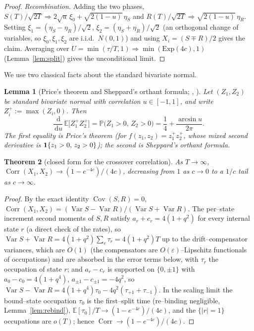 \documentclass[11pt]{article}
\theoremstyle{plain}
\newtheorem{theorem}{Theorem}[section]
\newtheorem{lemma}[theorem]{Lemma}
\theoremstyle{definition}
\theoremstyle{remark}
\DeclareMathOperator{\Var}{Var}\DeclareMathOperator{\Cov}{Cov}
\DeclareMathOperator{\Corr}{Corr}\DeclareMathOperator{\cum}{cum}
\newcommand{\E}{\mathbb{E}}\newcommand{\PP}{\mathbb{P}}\newcommand{\dd}{\,\mathrm{d}}
\newcommand{\To}{\Rightarrow}\newcommand{\so}{\mathfrak{so}}
\newcommand{\eps}{\varepsilon}\newcommand{\Exp}{\mathrm{Exp}}
\begin{document}
\begin{proof}
\emph{Recombination.} Adding the two phases,
$S(T)/\sqrt{2T}\To2\sqrt u\,\xi_0+\sqrt{2(1-u)}\,\eta_S$ and
$R(T)/\sqrt{2T}\To\sqrt{2(1-u)}\,\eta_R$. Setting $\xi_1=(\eta_S-\eta_R)/\sqrt2$,
$\xi_2=(\eta_S+\eta_R)/\sqrt2$ (an orthogonal change of variables, so $\xi_0,\xi_1,\xi_2$
are i.i.d.\ $N(0,1)$) and using $X_i=(S\mp R)/2$ gives the claim. Averaging over
$U=\min(\tau/T,1)\To\min(\Exp(4c),1)$ (Lemma~\ref{lem:split}) gives the unconditional limit.
\end{proof}

We use two classical facts about the standard bivariate normal.

\begin{lemma}[Price's theorem and Sheppard's orthant formula; {\cite{Price}}, {\cite{Sheppard}}]
\label{lem:price}
Let $(Z_1,Z_2)$ be standard bivariate normal with correlation $u\in[-1,1]$, and write
$Z_i^+:=\max(Z_i,0)$. Then
\begin{equation}\label{eq:price}
  \frac{\dd}{\dd u}\,\E\big[Z_1^+Z_2^+\big]=\PP\big(Z_1>0,\,Z_2>0\big)
  =\frac14+\frac{\arcsin u}{2\pi}.
\end{equation}
The first equality is Price's theorem (for $f(z_1,z_2)=z_1^+z_2^+$, whose mixed second
derivative is $\mathbf 1\{z_1>0,\,z_2>0\}$); the second is Sheppard's orthant formula.
\end{lemma}

\begin{theorem}[closed form for the crossover correlation]\label{thm:closed}
As $T\to\infty$, $\Corr(X_1,X_2)\to(1-e^{-4c})/(4c)$, decreasing from $1$ as $c\to0$ to a
$1/c$ tail as $c\to\infty$.
\end{theorem}
\begin{proof}
By the exact identity $\Cov(S,R)=0$,
$\Corr(X_1,X_2)=(\Var S-\Var R)/(\Var S+\Var R)$. The per--state increment second
moments of $S,R$ satisfy $a_r+c_r=4(1+q^2)$ for every internal state $r$ (a direct
check of the rates), so $\Var S+\Var R=4(1+q^2)\sum_r\tau_r=4(1+q^2)T$ up to the
drift--compensator variances, which are $O(1)$ (the compensators are
$O(\eps)$--Lipschitz functionals of occupations) and are absorbed in the error terms
below, with $\tau_r$ the occupation of state $r$; and $a_r-c_r$ is supported on $\{0,\pm1\}$ with
$a_0-c_0=4(1+q^4)$, $a_{\pm1}-c_{\pm1}=-4q^2$, so
$\Var S-\Var R=4(1+q^4)\tau_0-4q^2(\tau_{+1}+\tau_{-1})$. In the scaling limit the
bound--state occupation $\tau_0$ is the first--split time (re--binding negligible,
Lemma~\ref{lem:rebind}), $\E[\tau_0]/T\to(1-e^{-4c})/(4c)$, and the $\{|r|=1\}$
occupations are $o(T)$; hence $\Corr\to(1-e^{-4c})/(4c)$.
\end{proof}
\end{document}
